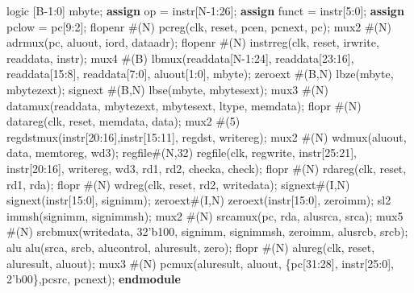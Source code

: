 \documentclass[]{article}
\newenvironment{Shaded}{}{}
\newcommand{\KeywordTok}[1]{\textcolor[rgb]{0.00,0.44,0.13}{\textbf{#1}}}
\newcommand{\DecValTok}[1]{\textcolor[rgb]{0.25,0.63,0.44}{#1}}
\newcommand{\BaseNTok}[1]{\textcolor[rgb]{0.25,0.63,0.44}{#1}}
\newcommand{\NormalTok}[1]{#1}
\begin{document}
\begin{Shaded}
\begin{Highlighting}[]
\NormalTok{    logic [B-}\DecValTok{1}\NormalTok{:}\DecValTok{0}\NormalTok{]   mbyte;}
    \KeywordTok{assign}\NormalTok{ op = instr[N-}\DecValTok{1}\NormalTok{:}\DecValTok{26}\NormalTok{];}
    \KeywordTok{assign}\NormalTok{ funct = instr[}\DecValTok{5}\NormalTok{:}\DecValTok{0}\NormalTok{];}
    \KeywordTok{assign}\NormalTok{ pclow = pc[}\DecValTok{9}\NormalTok{:}\DecValTok{2}\NormalTok{];}
\NormalTok{    flopenr #(N)    pcreg(clk, reset, pcen, pcnext, pc);}
\NormalTok{    mux2 #(N)       adrmux(pc, aluout, iord, dataadr);}
\NormalTok{    flopenr #(N)    instrreg(clk, reset, irwrite, readdata, instr);}
\NormalTok{    mux4 #(B)       lbmux(readdata[N-}\DecValTok{1}\NormalTok{:}\DecValTok{24}\NormalTok{], readdata[}\DecValTok{23}\NormalTok{:}\DecValTok{16}\NormalTok{], readdata[}\DecValTok{15}\NormalTok{:}\DecValTok{8}\NormalTok{],}
\NormalTok{                        readdata[}\DecValTok{7}\NormalTok{:}\DecValTok{0}\NormalTok{], aluout[}\DecValTok{1}\NormalTok{:}\DecValTok{0}\NormalTok{], mbyte);}
\NormalTok{    zeroext #(B,N)  lbze(mbyte, mbytezext);}
\NormalTok{    signext #(B,N)  lbse(mbyte, mbytesext);}
\NormalTok{    mux3 #(N)       datamux(readdata, mbytezext, mbytesext, ltype, memdata);}
\NormalTok{    flopr #(N)      datareg(clk, reset, memdata, data);}
\NormalTok{    mux2 #(}\DecValTok{5}\NormalTok{)       regdstmux(instr[}\DecValTok{20}\NormalTok{:}\DecValTok{16}\NormalTok{],instr[}\DecValTok{15}\NormalTok{:}\DecValTok{11}\NormalTok{], regdst, writereg);}
\NormalTok{    mux2 #(N)       wdmux(aluout, data, memtoreg, wd3);}
\NormalTok{    regfile#(N,}\DecValTok{32}\NormalTok{)  regfile(clk, regwrite, instr[}\DecValTok{25}\NormalTok{:}\DecValTok{21}\NormalTok{], instr[}\DecValTok{20}\NormalTok{:}\DecValTok{16}\NormalTok{],}
\NormalTok{                        writereg, wd3, rd1, rd2, checka, check);}
\NormalTok{    flopr #(N)      rdareg(clk, reset, rd1, rda);}
\NormalTok{    flopr #(N)      wdreg(clk, reset, rd2, writedata);}
\NormalTok{    signext#(I,N)   signext(instr[}\DecValTok{15}\NormalTok{:}\DecValTok{0}\NormalTok{], signimm);}
\NormalTok{    zeroext#(I,N)   zeroext(instr[}\DecValTok{15}\NormalTok{:}\DecValTok{0}\NormalTok{], zeroimm);}
\NormalTok{    sl2             immsh(signimm, signimmsh);}
\NormalTok{    mux2 #(N)       srcamux(pc, rda, alusrca, srca);}
\NormalTok{    mux5 #(N)       srcbmux(writedata, }\BaseNTok{32'b100}\NormalTok{, signimm, signimmsh, zeroimm, alusrcb, srcb);}
\NormalTok{    alu             alu(srca, srcb, alucontrol, aluresult, zero);}
\NormalTok{    flopr #(N)      alureg(clk, reset, aluresult, aluout);}
\NormalTok{    mux3 #(N)       pcmux(aluresult, aluout, \{pc[}\DecValTok{31}\NormalTok{:}\DecValTok{28}\NormalTok{], instr[}\DecValTok{25}\NormalTok{:}\DecValTok{0}\NormalTok{], }\BaseNTok{2'b00}\NormalTok{\},pcsrc, pcnext);}
\KeywordTok{endmodule}
\end{Highlighting}
\end{Shaded}
\end{document}
